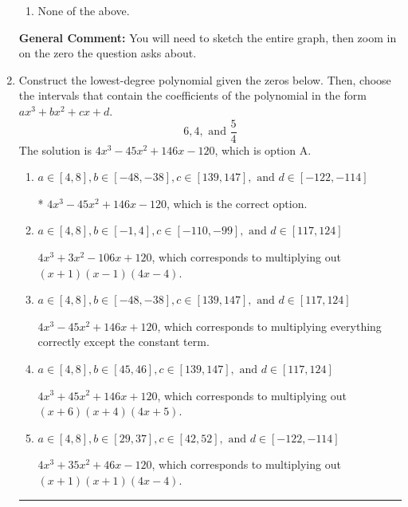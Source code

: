 \documentclass{extbook}[14pt]
\newcommand{\litem}[1]{\item #1

\rule{\textwidth}{0.4pt}}
\begin{document}
\begin{enumerate}
{\begin{enumerate}[label=\Alph*.]
\item None of the above.\end{enumerate}
\textbf{General Comment:} You will need to sketch the entire graph, then zoom in on the zero the question asks about.
}
\litem{
Construct the lowest-degree polynomial given the zeros below. Then, choose the intervals that contain the coefficients of the polynomial in the form $ax^3+bx^2+cx+d$.
\[ 6, 4, \text{ and } \frac{5}{4} \]
The solution is \( 4x^{3} -45 x^{2} +146 x -120 \), which is option A.\begin{enumerate}[label=\Alph*.]
\item \( a \in [4, 8], b \in [-48, -38], c \in [139, 147], \text{ and } d \in [-122, -114] \)

* $4x^{3} -45 x^{2} +146 x -120$, which is the correct option.
\item \( a \in [4, 8], b \in [-1, 4], c \in [-110, -99], \text{ and } d \in [117, 124] \)

$4x^{3} +3 x^{2} -106 x + 120$, which corresponds to multiplying out $(x + 1)(x -1)(4x -4)$.
\item \( a \in [4, 8], b \in [-48, -38], c \in [139, 147], \text{ and } d \in [117, 124] \)

$4x^{3} -45 x^{2} +146 x + 120$, which corresponds to multiplying everything correctly except the constant term.
\item \( a \in [4, 8], b \in [45, 46], c \in [139, 147], \text{ and } d \in [117, 124] \)

$4x^{3} +45 x^{2} +146 x + 120$, which corresponds to multiplying out $(x + 6)(x + 4)(4x + 5)$.
\item \( a \in [4, 8], b \in [29, 37], c \in [42, 52], \text{ and } d \in [-122, -114] \)

$4x^{3} +35 x^{2} +46 x -120$, which corresponds to multiplying out $(x + 1)(x + 1)(4x -4)$.
\end{enumerate}

}
\end{enumerate}
\end{document}

